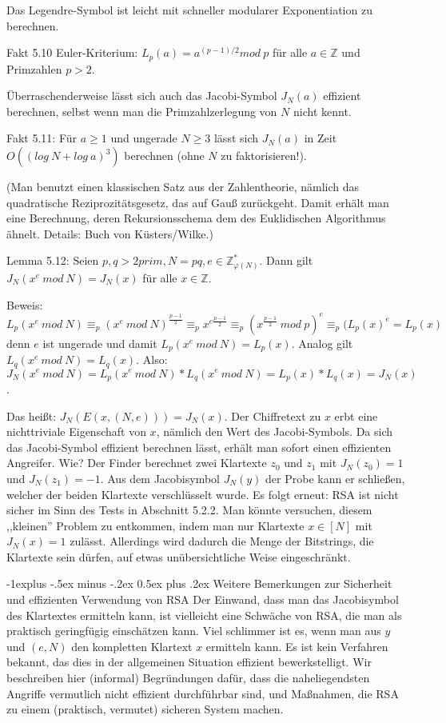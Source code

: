 \documentclass[a4paper]{article}
\makeatletter
\renewcommand{\subsection}{\@startsection{subsection}{2}{0mm}%
 {-1explus -.5ex minus -.2ex}%
 {0.5ex plus .2ex}%
 {\normalfont\normalsize\bfseries}}
\makeatother
\begin{document}
\begin{multicols}{3}
        Das Legendre-Symbol ist leicht mit schneller modularer Exponentiation zu berechnen.

        Fakt 5.10 Euler-Kriterium: $L_p(a) =a^{(p-1)/ 2}mod\ p$ für alle $a\in\mathbb{Z}$ und Primzahlen $p>2$.

        Überraschenderweise lässt sich auch das Jacobi-Symbol $J_N(a)$ effizient berechnen, selbst wenn man die Primzahlzerlegung von $N$ nicht kennt.

        Fakt 5.11: Für $a\geq 1$ und ungerade $N\geq 3$ lässt sich $J_N(a)$ in Zeit $O((log\ N+log\ a)^3)$ berechnen (ohne $N$ zu faktorisieren!).

        (Man benutzt einen klassischen Satz aus der Zahlentheorie, nämlich das quadratische Reziprozitätsgesetz, das auf Gauß zurückgeht. Damit erhält man eine Berechnung, deren Rekursionsschema dem des Euklidischen Algorithmus ähnelt. Details: Buch von Küsters/Wilke.)

        Lemma 5.12: Seien $p,q >2 prim,N=pq,e\in\mathbb{Z}^*_{\varphi(N)}$. Dann gilt $J_N(x^e\ mod\ N) =J_N(x)$ für alle $x\in\mathbb{Z}$.

        Beweis: $L_p(x^e\ mod\ N)\equiv_p (x^e\ mod\ N)^{\frac{p-1}{2}} \equiv_p x^{e\frac{p-1}{2}} \equiv_p (x^{\frac{p-1}{2}}\ mod\ p)^e \equiv_p (L_p(x)^e =L_p(x)$
        denn $e$ ist ungerade und damit $L_p(x^e\ mod\ N) =L_p(x)$. Analog gilt $L_q(x^e\ mod\ N) =L_q(x)$.
        Also: $J_N(x^e\ mod\ N) =L_p(x^e\ mod\ N)*L_q(x^e\ mod\ N) =L_p(x)*L_q(x) =J_N(x)$.

        Das heißt: $J_N(E(x,(N,e))) =J_N(x)$. Der Chiffretext zu $x$ erbt eine nichttriviale Eigenschaft von $x$, nämlich den Wert des Jacobi-Symbols. Da sich das Jacobi-Symbol effizient berechnen lässt, erhält man sofort einen effizienten Angreifer. Wie? Der Finder berechnet zwei Klartexte $z_0$ und $z_1$ mit $J_N(z_0) = 1$ und $J_N(z_1) = -1$. Aus dem Jacobisymbol $J_N(y)$ der Probe kann er schließen, welcher der beiden Klartexte verschlüsselt wurde. Es folgt erneut: RSA ist nicht sicher im Sinn des Tests in Abschnitt 5.2.2.
        Man könnte versuchen, diesem ,,kleinen'' Problem zu entkommen, indem man nur Klartexte $x\in [N]$ mit $J_N(x) = 1$ zulässt. Allerdings wird dadurch die Menge der Bitstrings, die Klartexte sein dürfen, auf etwas unübersichtliche Weise eingeschränkt.


        \subsection{Weitere Bemerkungen zur Sicherheit und effizienten Verwendung von RSA}
        Der Einwand, dass man das Jacobisymbol des Klartextes ermitteln kann, ist vielleicht eine Schwäche von RSA, die man als praktisch geringfügig einschätzen kann. Viel schlimmer ist es, wenn man aus $y$ und $(e,N)$ den kompletten Klartext $x$ ermitteln kann. Es ist kein Verfahren bekannt, das dies in der allgemeinen Situation effizient bewerkstelligt. Wir beschreiben hier (informal) Begründungen dafür, dass die naheliegendsten Angriffe vermutlich nicht effizient durchführbar sind, und Maßnahmen, die RSA zu einem (praktisch, vermutet) sicheren System machen.


\end{multicols}
\end{document}
